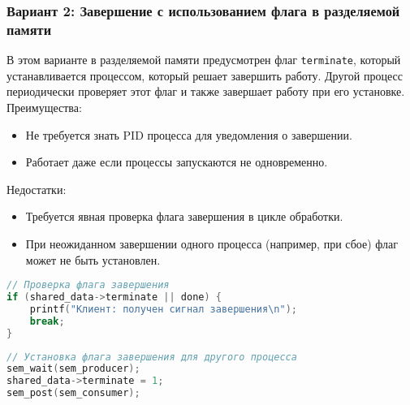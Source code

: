 \documentclass[a4paper,12pt]{article}
\begin{document}
\subsubsection{Вариант 2: Завершение с использованием флага в разделяемой памяти}
В этом варианте в разделяемой памяти предусмотрен флаг \texttt{terminate}, который устанавливается процессом, который решает завершить работу. Другой процесс периодически проверяет этот флаг и также завершает работу при его установке.
Преимущества:
\begin{itemize}
    \item Не требуется знать PID процесса для уведомления о завершении.
    \item Работает даже если процессы запускаются не одновременно.
\end{itemize}
Недостатки:
\begin{itemize}
    \item Требуется явная проверка флага завершения в цикле обработки.
    \item При неожиданном завершении одного процесса (например, при сбое) флаг может не быть установлен.
\end{itemize}
\begin{lstlisting}[language=C, caption=Проверка флага завершения]
// Проверка флага завершения
if (shared_data->terminate || done) {
    printf("Клиент: получен сигнал завершения\n");
    break;
}
\end{lstlisting}
\begin{lstlisting}[language=C, caption=Установка флага завершения]
// Установка флага завершения для другого процесса
sem_wait(sem_producer);
shared_data->terminate = 1;
sem_post(sem_consumer);
\end{lstlisting}
\end{document}
